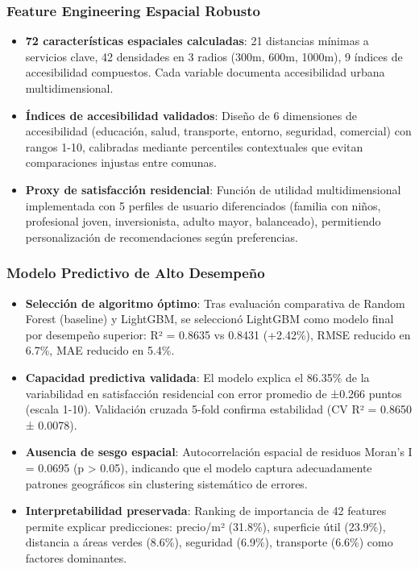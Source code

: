 \subsubsection{Feature Engineering Espacial Robusto}

\begin{itemize}
    \item \textbf{72 características espaciales calculadas}: 21 distancias mínimas a servicios clave, 42 densidades en 3 radios (300m, 600m, 1000m), 9 índices de accesibilidad compuestos. Cada variable documenta accesibilidad urbana multidimensional.
    
    \item \textbf{Índices de accesibilidad validados}: Diseño de 6 dimensiones de accesibilidad (educación, salud, transporte, entorno, seguridad, comercial) con rangos 1-10, calibradas mediante percentiles contextuales que evitan comparaciones injustas entre comunas.
    
    \item \textbf{Proxy de satisfacción residencial}: Función de utilidad multidimensional implementada con 5 perfiles de usuario diferenciados (familia con niños, profesional joven, inversionista, adulto mayor, balanceado), permitiendo personalización de recomendaciones según preferencias.
\end{itemize}

\subsubsection{Modelo Predictivo de Alto Desempeño}

\begin{itemize}
    \item \textbf{Selección de algoritmo óptimo}: Tras evaluación comparativa de Random Forest (baseline) y LightGBM, se seleccionó LightGBM como modelo final por desempeño superior: R² = 0.8635 vs 0.8431 (+2.42\%), RMSE reducido en 6.7\%, MAE reducido en 5.4\%.
    
    \item \textbf{Capacidad predictiva validada}: El modelo explica el 86.35\% de la variabilidad en satisfacción residencial con error promedio de ±0.266 puntos (escala 1-10). Validación cruzada 5-fold confirma estabilidad (CV R² = 0.8650 ± 0.0078).
    
    \item \textbf{Ausencia de sesgo espacial}: Autocorrelación espacial de residuos Moran's I = 0.0695 (p > 0.05), indicando que el modelo captura adecuadamente patrones geográficos sin clustering sistemático de errores.
    
    \item \textbf{Interpretabilidad preservada}: Ranking de importancia de 42 features permite explicar predicciones: precio/m² (31.8\%), superficie útil (23.9\%), distancia a áreas verdes (8.6\%), seguridad (6.9\%), transporte (6.6\%) como factores dominantes.
\end{itemize}

